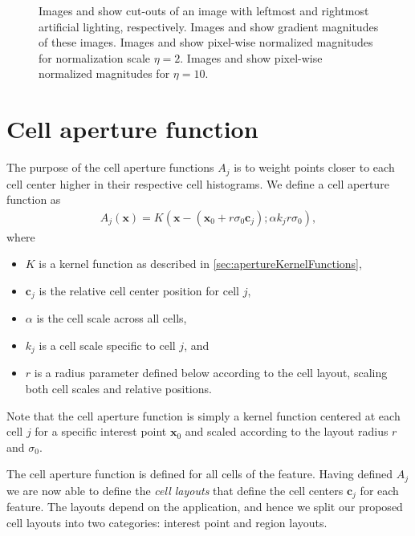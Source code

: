 \documentclass[thesis.tex]{subfiles}
\def\x{\mathbf{x}}
\def\c{\mathbf{c}}
\begin{document}
\begin{figure}[p]
\begin{subfigure}[t]{0.48\textwidth}
        \caption{}
        \label{fig:pixelNormalizationExample8}
    \end{subfigure}
    \caption{Images  and  show cut-outs of an image with leftmost and rightmost artificial lighting, respectively. Images  and  show gradient magnitudes of these images. Images  and  show pixel-wise normalized magnitudes for normalization scale $\eta = 2$. Images  and  show pixel-wise normalized magnitudes for $\eta = 10$.}
    \label{fig:pixelNormalizationExample}
\end{figure}
%
\section{Cell aperture function}
\label{sec:cellApertureFunction}
%
The purpose of the cell aperture functions $A_j$ is to weight points closer to each cell center higher in their respective cell histograms. We define a cell aperture function as
%
\begin{align}
A_j(\x) = K(\x - (\x_0 + r \sigma_0 \c_j); \alpha k_j r \sigma_0),
\end{align}
%
where
%
\begin{itemize}
\item[] $K$ is a kernel function as described in \ref{sec:apertureKernelFunctions},
\item[] $\c_j$ is the relative cell center position for cell $j$,
\item[] $\alpha$ is the cell scale across all cells,
\item[] $k_j$ is a cell scale specific to cell $j$, and
\item[] $r$ is a radius parameter defined below according to the cell layout, scaling both cell scales and relative positions.
\end{itemize}
%
Note that the cell aperture function is simply a kernel function centered at each cell $j$ for a specific interest point $\x_0$ and scaled according to the layout radius $r$ and $\sigma_0$.

The cell aperture function is defined for all cells of the feature. Having defined $A_j$ we are now able to define the \emph{cell layouts} that define the cell centers $\c_j$ for each feature. The layouts depend on the application, and hence we split our proposed cell layouts into two categories: interest point and region layouts.
\end{document}
